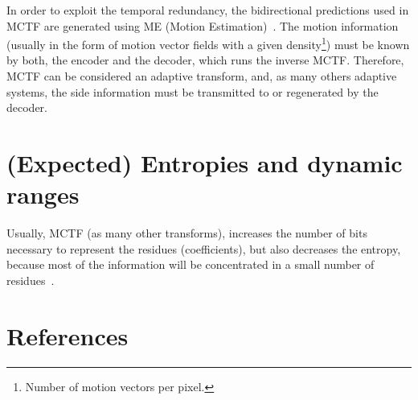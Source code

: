 In order to exploit the temporal redundancy, the bidirectional
predictions used in MCTF are generated using ME (Motion
Estimation)~\cite{vruiz__ME}. The motion information (usually in the
form of motion vector fields with a given density\footnote{Number of
  motion vectors per pixel.}) must be known by both, the encoder and
the decoder, which runs the inverse MCTF. Therefore, MCTF can be
considered an adaptive transform, and, as many others adaptive
systems, the side information must be transmitted to or regenerated by
the decoder.


\section{(Expected) Entropies and  dynamic ranges}

Usually, MCTF (as many other transforms), increases the number of bits
necessary to represent the residues (coefficients), but also decreases
the entropy, because most of the information will be concentrated in a
small number of residues~\cite{vruiz__MC}.


\section{References}

\renewcommand{\addcontentsline}[3]{}%


